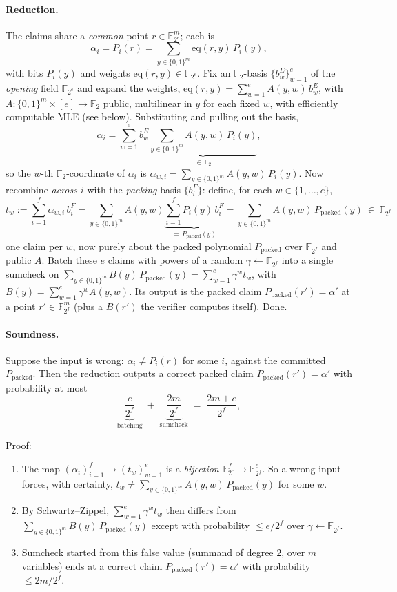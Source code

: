 \documentclass[11pt]{article}
\newcommand{\F}{\mathbb{F}}
\newcommand{\eq}{\mathrm{eq}}
\newcommand{\pkd}{\mathrm{packed}}
\begin{document}
\paragraph{Reduction.} The claims share a \emph{common} point $r\in\F_{2^e}^m$; each is
\[
\alpha_i=P_i(r)=\sum_{y\in\{0,1\}^m}\eq(r,y)\,P_i(y),
\]
with bits $P_i(y)$ and weights $\eq(r,y)\in\F_{2^e}$. Fix an $\F_2$-basis $\{b^{E}_w\}_{w=1}^e$ of the \emph{opening} field $\F_{2^e}$ and expand the weights, $\eq(r,y)=\sum_{w=1}^e A(y,w)\,b^{E}_w$, with $A:\{0,1\}^m\times[e]\to\F_2$ public, multilinear in $y$ for each fixed $w$, with efficiently computable MLE (see  below). Substituting and pulling out the basis,
\[
\alpha_i=\sum_{w=1}^eb^{E}_w\underbrace{\sum_{y\in\{0,1\}^m}A(y,w)\,P_i(y)}_{\in\,\F_2},
\]
so the $w$-th $\F_2$-coordinate of $\alpha_i$ is $\alpha_{w,i}=\sum_{y\in\{0,1\}^m}A(y,w)\,P_i(y)$. Now recombine \emph{across $i$} with the \emph{packing} basis $\{b^{F}_i\}$: define, for each $w \in \{1,\dots,e\}$,
\[
t_w:=\sum_{i=1}^f\alpha_{w,i}\,b^{F}_i=\sum_{y\in\{0,1\}^m}A(y,w)\underbrace{\sum_{i=1}^fP_i(y)\,b^{F}_i}_{=\,P_\pkd(y)}=\sum_{y\in\{0,1\}^m}A(y,w)\,P_\pkd(y)\ \in\ \F_{2^f}
\]
one claim per $w$, now purely about the packed polynomial $P_\pkd$ over $\F_{2^f}$ and public $A$. Batch these $e$ claims with powers of a random $\gamma\leftarrow\F_{2^f}$ into a single sumcheck on $\sum_{y\in\{0,1\}^m}B(y)\,P_\pkd(y)=\sum_{w=1}^e\gamma^w t_w$, with $B(y)=\sum_{w=1}^e\gamma^w A(y,w)$. Its output is the packed claim $P_\pkd(r')=\alpha'$ at a point $r'\in\F_{2^f}^m$ (plus a $B(r')$ the verifier computes itself). Done.

\paragraph{Soundness.} Suppose the input is wrong: $\alpha_i\neq P_i(r)$ for some $i$, against the committed $P_\pkd$. Then the reduction outputs a correct packed claim $P_\pkd(r')=\alpha'$ with probability at most
\[
\underbrace{\frac{e}{2^f}}_{\text{batching}}\;+\;\underbrace{\frac{2m}{2^f}}_{\text{sumcheck}}\;=\;\frac{2m+e}{2^f},
\]

Proof:

\begin{enumerate}
\item The map $(\alpha_i)_{i=1}^f\mapsto(t_w)_{w=1}^e$ is a \emph{bijection} $\F_{2^e}^f\to\F_{2^f}^e$. So a wrong input forces, with certainty, $t_w\neq\sum_{y\in\{0,1\}^m}A(y,w)\,P_\pkd(y)$ for some $w$.
\item By Schwartz--Zippel, $\sum_{w=1}^e\gamma^w t_w$ then differs from $\sum_{y\in\{0,1\}^m}B(y)\,P_\pkd(y)$ except with probability $\le e/2^f$ over $\gamma\leftarrow\F_{2^f}$.
\item Sumcheck started from this false value (summand of degree $2$, over $m$ variables) ends at a correct claim $P_\pkd(r')=\alpha'$ with probability $\le 2m/2^f$.
\end{enumerate}
\end{document}
